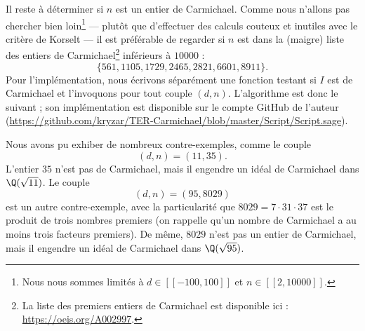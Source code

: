 \documentclass[a4paper, 12pt, oneside]{article}
\begin{document}
\begin{appendix}
Il reste à déterminer si $n$ est un entier de Carmichael. Comme nous n'allons pas chercher bien loin\footnote{Nous nous sommes limités à $d\in [\![-100, 100]\!]$ et $n\in [\![2, 10000]\!]$.} — plutôt que d'effectuer des calculs couteux et inutiles avec le critère de Korselt — il est préférable de regarder si $n$ est dans la (maigre) liste des entiers de Carmichael\footnote{La liste des premiers entiers de Carmichael est disponible ici : \url{https://oeis.org/A002997}.} inférieurs à $10000$ : $$\{561, 1105, 1729, 2465, 2821, 6601, 8911\}.$$ Pour l'implémentation, nous écrivons séparément une fonction testant si $I$ est de Carmichael et l'invoquons pour tout couple $(d, n)$. L'algorithme est donc le suivant ; son implémentation est disponible sur le compte GitHub de l'auteur (\url{https://github.com/kryzar/TER-Carmichael/blob/master/Script/Script.sage}).

\vspace{1em}
\begin{algorithm}[H]
\end{algorithm}
\vspace{1em}

Nous avons pu exhiber de nombreux contre-exemples, comme le couple $$(d, n) = (11, 35).$$ L'entier $35$ n'est pas de Carmichael, mais il engendre un idéal de Carmichael dans $\Q(\sqrt{11})$. Le couple $$(d, n) = (95,8029)$$ est un autre contre-exemple, avec la particularité que $8029 = 7\cdot 31\cdot 37$ est le produit de trois nombres premiers (on rappelle qu'un nombre de Carmichael a au moins trois facteurs premiers). De même, $8029$ n'est pas un entier de Carmichael, mais il engendre un idéal de Carmichael dans $\Q(\sqrt{95})$.

\end{appendix}

\nocite{*}
\printbibliography
\end{document}
